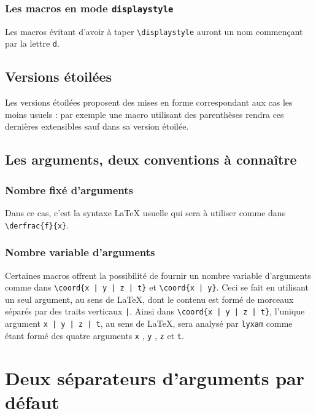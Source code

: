 \documentclass[12pt,a4paper]{article}
\theoremstyle{definition}
\begin{document}
\subsubsection{Les macros en mode \texttt{displaystyle}}

Les macros évitant d'avoir à taper \verb+\displaystyle+ auront un nom commençant par la lettre \verb+d+.



\subsection{Versions étoilées}

Les versions étoilées proposent des mises en forme correspondant aux cas les moins usuels : par exemple une macro utilisant des parenthèses rendra ces dernières extensibles sauf dans sa version étoilée.



\subsection{Les arguments, deux conventions à connaître}

\subsubsection{Nombre fixé d'arguments}

Dans ce cas, c'est la syntaxe \LaTeX{} usuelle qui sera à utiliser comme dans \verb+\derfrac{f}{x}+.



\subsubsection{Nombre variable d'arguments}

Certaines macros offrent la possibilité de fournir un nombre variable d'arguments comme dans \verb+\coord{x | y | z | t}+ et \verb+\coord{x | y}+.
Ceci se fait en utilisant un seul argument, au sens de \LaTeX{}, dont le contenu est formé de morceaux séparés par des traits verticaux \verb+|+.
Ainsi dans \verb+\coord{x | y | z | t}+, l'unique argument \verb+x | y | z | t+, au sens de \LaTeX{}, sera analysé par \verb+lyxam+ comme étant formé des quatre arguments \verb+x+ , \verb+y+ , \verb+z+ et \verb+t+.




\section{Deux séparateurs d'arguments par défaut}
\end{document}
